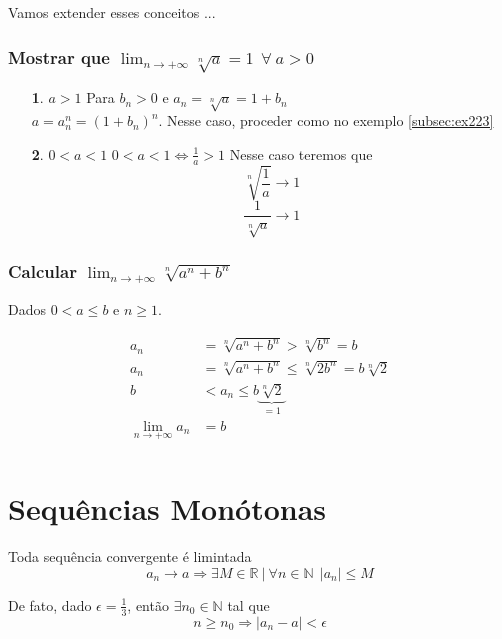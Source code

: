 \documentclass[12pt,openany]{book}
\begin{document}
\vspace{10mm}
Vamos extender esses conceitos ...

\subsubsection {Mostrar que $\displaystyle{\lim_{n \rightarrow +\infty} \sqrt[n]{a}} = 1 \ \ \forall \ a > 0$}
\label{sssec:ss2232}
\begin{itemize}
\item [\textbf{1}. $ a > 1 $] Para $b_n > 0$ e $a_n = \sqrt[n]{a} = 1 + b_n$ \\ $a = a_n^n = (1 + b_n)^n$. Nesse caso, proceder como no exemplo \ref{subsec:ex223} 
\item [\textbf{2}. $ 0 < a < 1 $] $ 0 < a < 1 \Longleftrightarrow \frac{1}{a} > 1$ Nesse caso teremos que $$ \sqrt[n]{\frac{1}{a}} \rightarrow 1 $$ $$\frac{1}{\sqrt[n]{a}}\rightarrow 1 $$
\end{itemize}

\subsubsection {Calcular $\displaystyle{\lim_{n \rightarrow +\infty} \sqrt[n]{a^n + b^n}}$}
\label{sssec:ss2233}
\hspace{5mm} Dados $0 < a \leq b$ e $n \geq 1$.

\begin{align*}
a_n &= \sqrt[n]{a^n+b^n} > \sqrt[n]{b^n} = b \\
a_n &= \sqrt[n]{a^n+b^n} \leq \sqrt[n]{2b^n} = b\sqrt[n]{2}\\
b &< a_n \leq b\underbrace{\sqrt[n]{2}}_{= 1}\\
\lim_{n \rightarrow + \infty} a_n &= b \\
\end{align*}

\section{Sequências Monótonas}
\label{sec:s23}

\hspace{5mm}Toda sequência convergente é limintada $$a_n \rightarrow a \Rightarrow \exists M \in \mathds{R} \ | \ \forall n \in \mathds{N} \ \ |a_n| \leq M$$ 

De fato, dado $\epsilon = \frac{1}{3}$, então $\exists n_0 \in \mathds{N}$ tal que $$ n \geq n_0 \Rightarrow |a_n - a| < \epsilon$$
\end{document}
